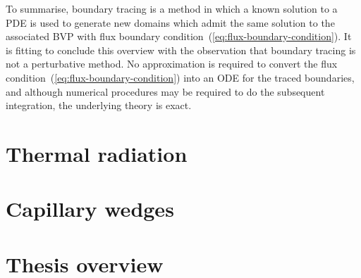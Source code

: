 To summarise, boundary tracing is a method in which
a known solution to a PDE is used
to generate new domains which admit the same solution
to the associated BVP
with flux boundary condition~(\ref{eq:flux-boundary-condition}).
It is fitting to conclude this overview with the observation that
boundary tracing is not a perturbative method.
No approximation is required
to convert the flux condition~(\ref{eq:flux-boundary-condition})
into an ODE for the traced boundaries,
and although numerical procedures may be required
to do the subsequent integration,
the underlying theory is exact.

\section{Thermal radiation}

\section{Capillary wedges}

\section{Thesis overview}
